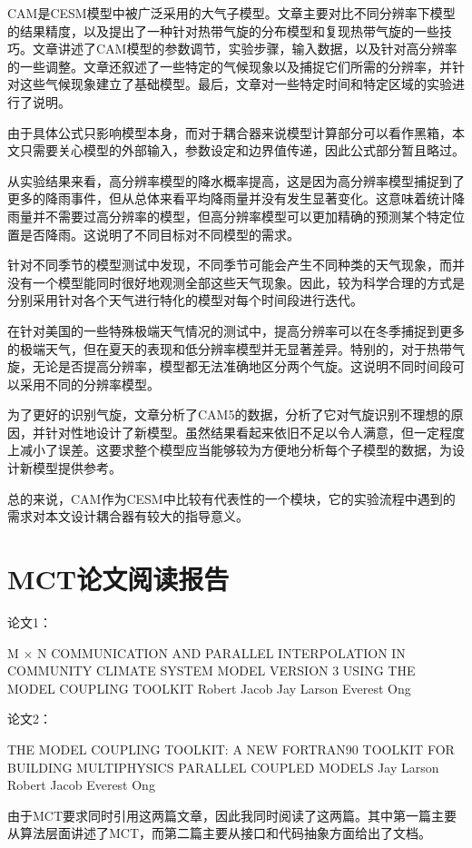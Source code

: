 CAM是CESM模型中被广泛采用的大气子模型。文章主要对比不同分辨率下模型的结果精度，以及提出了一种针对热带气旋的分布模型和复现热带气旋的一些技巧。文章讲述了CAM模型的参数调节，实验步骤，输入数据，以及针对高分辨率的一些调整。文章还叙述了一些特定的气候现象以及捕捉它们所需的分辨率，并针对这些气候现象建立了基础模型。最后，文章对一些特定时间和特定区域的实验进行了说明。

由于具体公式只影响模型本身，而对于耦合器来说模型计算部分可以看作黑箱，本文只需要关心模型的外部输入，参数设定和边界值传递，因此公式部分暂且略过。

从实验结果来看，高分辨率模型的降水概率提高，这是因为高分辨率模型捕捉到了更多的降雨事件，但从总体来看平均降雨量并没有发生显著变化。这意味着统计降雨量并不需要过高分辨率的模型，但高分辨率模型可以更加精确的预测某个特定位置是否降雨。这说明了不同目标对不同模型的需求。

针对不同季节的模型测试中发现，不同季节可能会产生不同种类的天气现象，而并没有一个模型能同时很好地观测全部这些天气现象。因此，较为科学合理的方式是分别采用针对各个天气进行特化的模型对每个时间段进行迭代。

在针对美国的一些特殊极端天气情况的测试中，提高分辨率可以在冬季捕捉到更多的极端天气，但在夏天的表现和低分辨率模型并无显著差异。特别的，对于热带气旋，无论是否提高分辨率，模型都无法准确地区分两个气旋。这说明不同时间段可以采用不同的分辨率模型。

为了更好的识别气旋，文章分析了CAM5的数据，分析了它对气旋识别不理想的原因，并针对性地设计了新模型。虽然结果看起来依旧不足以令人满意，但一定程度上减小了误差。这要求整个模型应当能够较为方便地分析每个子模型的数据，为设计新模型提供参考。

总的来说，CAM作为CESM中比较有代表性的一个模块，它的实验流程中遇到的需求对本文设计耦合器有较大的指导意义。

\section{MCT论文阅读报告}

论文1：

M × N COMMUNICATION AND PARALLEL INTERPOLATION IN COMMUNITY CLIMATE SYSTEM MODEL VERSION 3 USING THE MODEL COUPLING TOOLKIT Robert Jacob Jay Larson Everest Ong

论文2：

THE MODEL COUPLING TOOLKIT: A NEW FORTRAN90 TOOLKIT FOR BUILDING MULTIPHYSICS PARALLEL COUPLED MODELS Jay Larson Robert Jacob Everest Ong

	由于MCT要求同时引用这两篇文章，因此我同时阅读了这两篇。其中第一篇主要从算法层面讲述了MCT，而第二篇主要从接口和代码抽象方面给出了文档。

